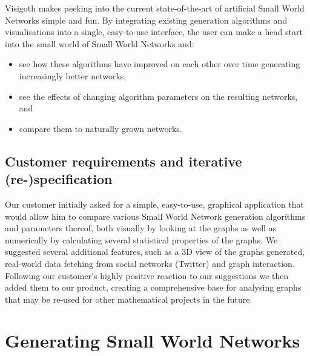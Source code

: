 \documentclass[a4paper,11pt,titlepage]{article}
\let\stdsection\section         %
\renewcommand{\section}{\newpage\stdsection}
\begin{document}
Visigoth makes peeking into the current state-of-the-art of artificial
Small World Networks simple and fun. By integrating existing
generation algorithms and visualisations into a single, easy-to-use
interface, the user can make a head start into the small world of
Small World Networks and:
\begin{itemize}
  \item see how these algorithms have improved on each other over time
    generating increasingly better networks,
  \item see the effects of changing algorithm parameters on the
    resulting networks, and
  \item compare them to naturally grown networks.
\end{itemize}

\subsection{Customer requirements and iterative (re-)specification}

%
%

Our customer initially asked for a simple, easy-to-use, graphical
application that would allow him to compare various Small World
Network generation algorithms and parameters thereof, both visually
by looking at the graphs as well as numerically by calculating
several statistical properties of the graphs.
We suggested several additional features, such as a 3D view of the
graphs generated, real-world data fetching from social networks
(Twitter) and graph interaction. Following our customer's highly
positive reaction to our suggestions we then added them to our
product, creating a comprehensive base for analysing graphs that
may be re-used for other mathematical projects in the future.





\section{Generating Small World Networks}
\end{document}
